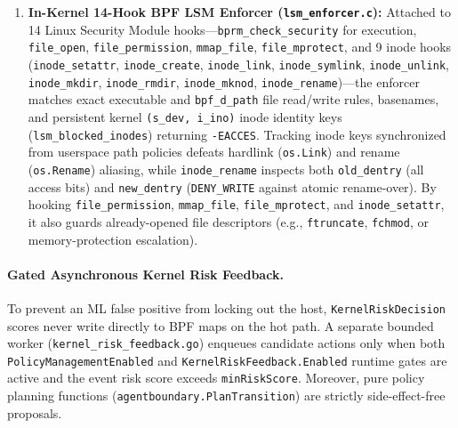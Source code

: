 \documentclass[10pt,twocolumn,letterpaper]{article}
\newcommand{\code}[1]{\texttt{\small #1}}
\begin{document}
\begin{enumerate}
  \item \textbf{In-Kernel 14-Hook BPF LSM Enforcer (\code{lsm\_enforcer.c}):} Attached to 14 Linux Security Module hooks---\code{bprm\_check\_security} for execution, \code{file\_open}, \code{file\_permission}, \code{mmap\_file}, \code{file\_mprotect}, and 9 inode hooks (\code{inode\_setattr}, \code{inode\_create}, \code{inode\_link}, \code{inode\_symlink}, \code{inode\_unlink}, \code{inode\_mkdir}, \code{inode\_rmdir}, \code{inode\_mknod}, \code{inode\_rename})---the enforcer matches exact executable and \code{bpf\_d\_path} file read/write rules, basenames, and persistent kernel \code{(s\_dev, i\_ino)} inode identity keys (\code{lsm\_blocked\_inodes}) returning \code{-EACCES}. Tracking inode keys synchronized from userspace path policies defeats hardlink (\code{os.Link}) and rename (\code{os.Rename}) aliasing, while \code{inode\_rename} inspects both \code{old\_dentry} (all access bits) and \code{new\_dentry} (\code{DENY\_WRITE} against atomic rename-over). By hooking \code{file\_permission}, \code{mmap\_file}, \code{file\_mprotect}, and \code{inode\_setattr}, it also guards already-opened file descriptors (e.g., \code{ftruncate}, \code{fchmod}, or memory-protection escalation).
\end{enumerate}

\paragraph{Gated Asynchronous Kernel Risk Feedback.} To prevent an ML false positive from locking out the host, \code{KernelRiskDecision} scores never write directly to BPF maps on the hot path. A separate bounded worker (\code{kernel\_risk\_feedback.go}) enqueues candidate actions only when both \code{PolicyManagementEnabled} and \code{KernelRiskFeedback.Enabled} runtime gates are active and the event risk score exceeds \code{minRiskScore}. Moreover, pure policy planning functions (\code{agentboundary.PlanTransition}) are strictly side-effect-free proposals.
\end{document}
